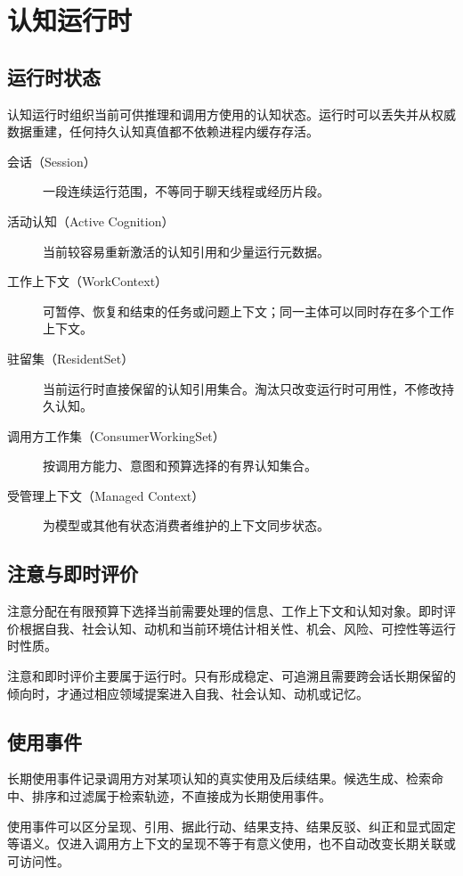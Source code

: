 \chapter{认知运行时}

\section{运行时状态}

认知运行时组织当前可供推理和调用方使用的认知状态。运行时可以丢失并从权威数据重建，任何持久认知真值都不依赖进程内缓存存活。

\begin{description}
\item[会话（Session）] 一段连续运行范围，不等同于聊天线程或经历片段。
\item[活动认知（Active Cognition）] 当前较容易重新激活的认知引用和少量运行元数据。
\item[工作上下文（WorkContext）] 可暂停、恢复和结束的任务或问题上下文；同一主体可以同时存在多个工作上下文。
\item[驻留集（ResidentSet）] 当前运行时直接保留的认知引用集合。淘汰只改变运行时可用性，不修改持久认知。
\item[调用方工作集（ConsumerWorkingSet）] 按调用方能力、意图和预算选择的有界认知集合。
\item[受管理上下文（Managed Context）] 为模型或其他有状态消费者维护的上下文同步状态。
\end{description}

\section{注意与即时评价}

注意分配在有限预算下选择当前需要处理的信息、工作上下文和认知对象。即时评价根据自我、社会认知、动机和当前环境估计相关性、机会、风险、可控性等运行时性质。

注意和即时评价主要属于运行时。只有形成稳定、可追溯且需要跨会话长期保留的倾向时，才通过相应领域提案进入自我、社会认知、动机或记忆。

\section{使用事件}

长期使用事件记录调用方对某项认知的真实使用及后续结果。候选生成、检索命中、排序和过滤属于检索轨迹，不直接成为长期使用事件。

使用事件可以区分呈现、引用、据此行动、结果支持、结果反驳、纠正和显式固定等语义。仅进入调用方上下文的呈现不等于有意义使用，也不自动改变长期关联或可访问性。

